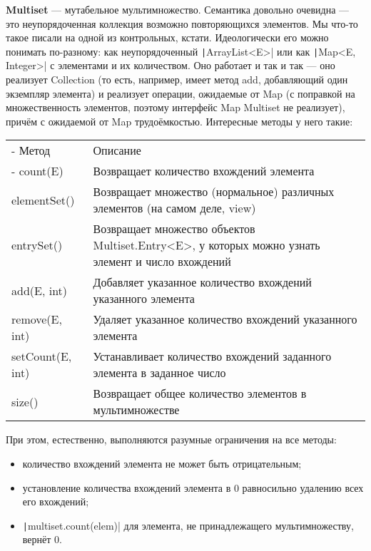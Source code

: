 \documentclass[a5paper,draft]{article}
\begin{document}
\textbf{Multiset} --- мутабельное мультимножество. Семантика довольно очевидна --- это неупорядоченная коллекция возможно повторяющихся элементов. Мы что-то такое писали на одной из контрольных, кстати. Идеологически его можно понимать по-разному: как неупорядоченный \texttt|ArrayList<E>| или как \texttt|Map<E, Integer>| с элементами и их количеством. Оно работает и так и так --- оно реализует Collection (то есть, например, имеет метод add, добавляющий один экземпляр элемента) и реализует операции, ожидаемые от Map (с поправкой на множественность элементов, поэтому интерфейс Map Multiset не реализует), причём с ожидаемой от Map трудоёмкостью. Интересные методы у него такие:

\begin{footnotesize}
\begin{tabu} {| X[0.9 l p] | X[1 l p] |}
	\tabucline-
	Метод            & Описание                                                                                          \\
	\tabucline-
	\everyrow{\tabucline-}
	count(E)         & Возвращает количество вхождений элемента                                                          \\
	elementSet()     & Возвращает множество (нормальное) различных элементов (на самом деле, view)                       \\
	entrySet()       & Возвращает множество объектов Multiset.Entry<E>, у которых можно узнать элемент и число вхождений \\
	add(E, int)      & Добавляет указанное количество вхождений указанного элемента                                      \\
	remove(E, int)   & Удаляет указанное количество вхождений указанного элемента                                        \\
	setCount(E, int) & Устанавливает количество вхождений заданного элемента в заданное число                            \\
	size()           & Возвращает общее количество элементов в мультимножестве                                           \\
\end{tabu}
\end{footnotesize}

При этом, естественно, выполняются разумные ограничения на все методы:
\begin{itemize}
	\item количество вхождений элемента не может быть отрицательным;
	\item установление количества вхождений элемента в 0 равносильно удалению всех его вхождений;
	\item \texttt|multiset.count(elem)| для элемента, не принадлежащего мультимножеству, вернёт 0.
\end{itemize}
\end{document}

